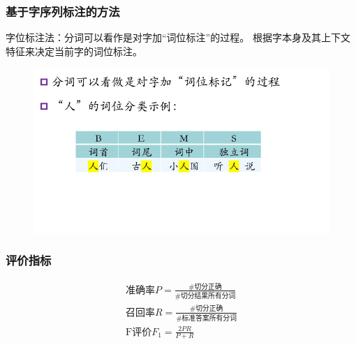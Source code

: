 \subsubsection{基于字序列标注的方法}
字位标注法：分词可以看作是对字加``词位标注''的过程。
根据字本身及其上下文特征来决定当前字的词位标注。
\begin{figure}[H]
\centering
\includegraphics[width=0.6\linewidth]{fig/word_pos_labeling.png}
\end{figure}

\subsubsection{评价指标}
\[\begin{aligned}
\text{准确率}P=\frac{\#切分正确}{\#切分结果所有分词}\\
\text{召回率}R=\frac{\#切分正确}{\#标准答案所有分词}\\
\text{F评价}F_1=\frac{2PR}{P+R}
\end{aligned}\]